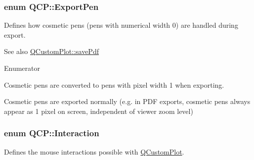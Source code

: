\subsubsection[{\texorpdfstring{Export\+Pen}{ExportPen}}]{\setlength{\rightskip}{0pt plus 5cm}enum {\bf Q\+C\+P\+::\+Export\+Pen}}\hypertarget{namespaceQCP_a17844f19e1019693a953e1eb93536d2f}{}\label{namespaceQCP_a17844f19e1019693a953e1eb93536d2f}
Defines how cosmetic pens (pens with numerical width 0) are handled during export.

\begin{DoxySeeAlso}{See also}
\hyperlink{classQCustomPlot_ad5acd34f6b39c3516887d7e54fec2412}{Q\+Custom\+Plot\+::save\+Pdf} 
\end{DoxySeeAlso}
\begin{Desc}
\item[Enumerator]\par
\begin{description}
\item[{\em 
ep\+No\+Cosmetic\hypertarget{namespaceQCP_a17844f19e1019693a953e1eb93536d2faae8fcfaafee234ce18558afef83f6a78}{}\label{namespaceQCP_a17844f19e1019693a953e1eb93536d2faae8fcfaafee234ce18558afef83f6a78}
}]Cosmetic pens are converted to pens with pixel width 1 when exporting. \item[{\em 
ep\+Allow\+Cosmetic\hypertarget{namespaceQCP_a17844f19e1019693a953e1eb93536d2fa50d3657dba3fb90560b93a823cb0a6e8}{}\label{namespaceQCP_a17844f19e1019693a953e1eb93536d2fa50d3657dba3fb90560b93a823cb0a6e8}
}]Cosmetic pens are exported normally (e.\+g. in P\+DF exports, cosmetic pens always appear as 1 pixel on screen, independent of viewer zoom level) \end{description}
\end{Desc}
\subsubsection[{\texorpdfstring{Interaction}{Interaction}}]{\setlength{\rightskip}{0pt plus 5cm}enum {\bf Q\+C\+P\+::\+Interaction}}\hypertarget{namespaceQCP_a2ad6bb6281c7c2d593d4277b44c2b037}{}\label{namespaceQCP_a2ad6bb6281c7c2d593d4277b44c2b037}
Defines the mouse interactions possible with \hyperlink{classQCustomPlot}{Q\+Custom\+Plot}.

